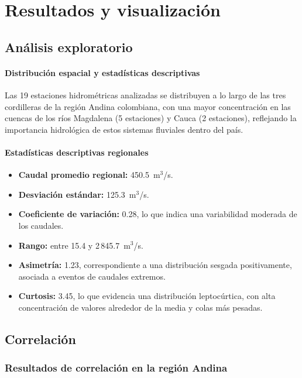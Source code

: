 \chapter{Resultados y visualización}
\label{chp:6}

\section{Análisis exploratorio}
\label{sec:chp6-2}

\subsubsection*{Distribución espacial y estadísticas descriptivas}

Las 19 estaciones hidrométricas analizadas se distribuyen a lo largo de las tres cordilleras de la región Andina colombiana, con una mayor concentración en las cuencas de los ríos Magdalena (5 estaciones) y Cauca (2 estaciones), reflejando la importancia hidrológica de estos sistemas fluviales dentro del país.

\subsubsection*{Estadísticas descriptivas regionales}
\begin{itemize}
    \item \textbf{Caudal promedio regional:} 450.5~m$^{3}$/s.
    \item \textbf{Desviación estándar:} 125.3~m$^{3}$/s.
    \item \textbf{Coeficiente de variación:} 0.28, lo que indica una variabilidad moderada de los caudales.
    \item \textbf{Rango:} entre 15.4 y 2\,845.7~m$^{3}$/s.
    \item \textbf{Asimetría:} 1.23, correspondiente a una distribución sesgada positivamente, asociada a eventos de caudales extremos.
    \item \textbf{Curtosis:} 3.45, lo que evidencia una distribución leptocúrtica, con alta concentración de valores alrededor de la media y colas más pesadas.
\end{itemize}

\section{Correlación}
\label{sec:chp6-2}
\subsection{Resultados de correlación en la región Andina}

